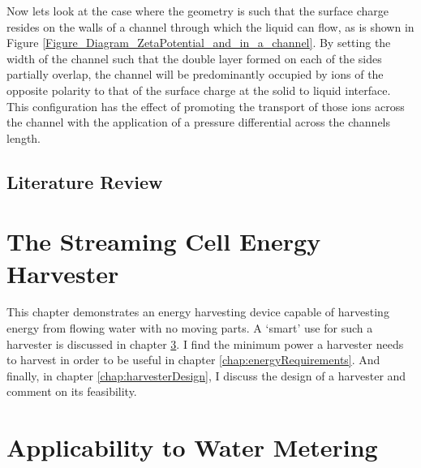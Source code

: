     Now lets look at the case where the geometry is such that the surface charge
    resides on the walls of a channel through which the liquid can flow, as is
    shown in Figure \ref{Figure_Diagram_ZetaPotential_and_in_a_channel}.  By
    setting the width of the channel such that the double layer formed on each of
    the sides partially overlap, the channel will be predominantly occupied by ions
    of the opposite polarity to that of the surface charge at the solid to liquid
    interface. This configuration has the effect of promoting the transport of
    those ions across the channel with the application of a pressure differential
    across the channels length.








  \section{Literature Review}

\chapter{The Streaming Cell Energy Harvester}
  \label{chap:harvestingEnergy}

  This chapter demonstrates an energy harvesting device capable of harvesting energy from flowing water with no moving parts.
  A `smart' use for such a harvester is discussed in chapter \ref{chap:wirelessWaterMetering}.
  I find the minimum power a harvester needs to harvest in order to be useful in chapter \ref{chap:energyRequirements}.
  And finally, in chapter \ref{chap:harvesterDesign}, I discuss the design of a harvester and comment on its feasibility.

  

\chapter{Applicability to Water Metering}
  \label{chap:wirelessWaterMetering}

